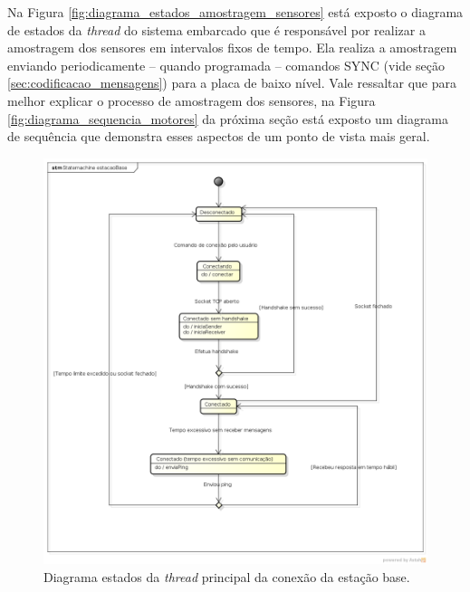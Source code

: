 Na Figura \ref{fig:diagrama_estados_amostragem_sensores} está exposto o diagrama de estados da \textit{thread} do sistema embarcado que é responsável por realizar a amostragem dos sensores em intervalos fixos de tempo. Ela realiza a amostragem enviando periodicamente -- quando programada -- comandos SYNC (vide seção \ref{sec:codificacao_mensagens}) para a placa de baixo nível. Vale ressaltar que para melhor explicar o processo de amostragem dos sensores, na Figura \ref{fig:diagrama_sequencia_motores} da próxima seção está exposto um diagrama de sequência que demonstra esses aspectos de um ponto de vista mais geral.



\begin{figure}[H]
  \centering
  \includegraphics[width=\textwidth, keepaspectratio]{./figuras/diagrama_estados_estacao_base.png}
  \caption{Diagrama estados da \textit{thread} principal da conexão da estação base.}
  \label{fig:diagrama_estados_estacao_base}
\end{figure}

